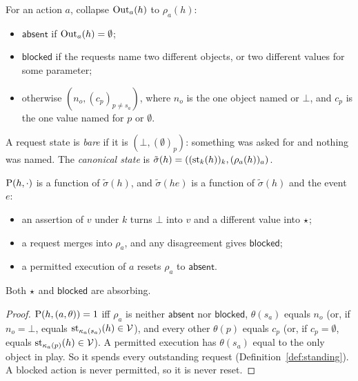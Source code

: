 \begin{definition}
For an action $a$, collapse $\mathrm{Out}_a(h)$ to $\rho_a(h)$:
\begin{itemize}
\item $\mathsf{absent}$ if $\mathrm{Out}_a(h) = \emptyset$;
\item $\mathsf{blocked}$ if the requests name two different objects, or two different values
  for some parameter;
\item otherwise $(n_o, (c_p)_{p \neq s_a})$, where $n_o$ is the one object named or $\bot$, and
  $c_p$ is the one value named for $p$ or $\emptyset$.
\end{itemize}
A request state is \emph{bare} if it is $(\bot, (\emptyset)_p)$: something was asked for and
nothing was named. The \emph{canonical state} is $\tilde\sigma(h) = ((\mathrm{st}_k(h))_k, (\rho_a(h))_a)$.
\end{definition}

\begin{lemma}\label{lem:machine}
$\mathrm{P}(h, \cdot)$ is a function of $\tilde\sigma(h)$, and $\tilde\sigma(he)$ is a function of
$\tilde\sigma(h)$ and the event $e$:
\begin{itemize}
\item an assertion of $v$ under $k$ turns $\bot$ into $v$ and a different value into $\star$;
\item a request merges into $\rho_a$, and any disagreement gives $\mathsf{blocked}$;
\item a permitted execution of $a$ resets $\rho_a$ to $\mathsf{absent}$.
\end{itemize}
Both $\star$ and $\mathsf{blocked}$ are absorbing.
\end{lemma}
\begin{proof}
$\mathrm{P}(h, (a, \theta)) = 1$ iff $\rho_a$ is neither $\mathsf{absent}$ nor $\mathsf{blocked}$,
$\theta(s_a)$ equals $n_o$ (or, if $n_o = \bot$, equals $\mathrm{st}_{\kappa_a(s_a)}(h) \in \mathcal{V}$), and every
other $\theta(p)$ equals $c_p$ (or, if $c_p = \emptyset$, equals $\mathrm{st}_{\kappa_a(p)}(h) \in \mathcal{V}$). A
permitted execution has $\theta(s_a)$ equal to the only object in play. So it spends every
outstanding request (Definition~\ref{def:standing}). A blocked action is never permitted, so it
is never reset.
\end{proof}

